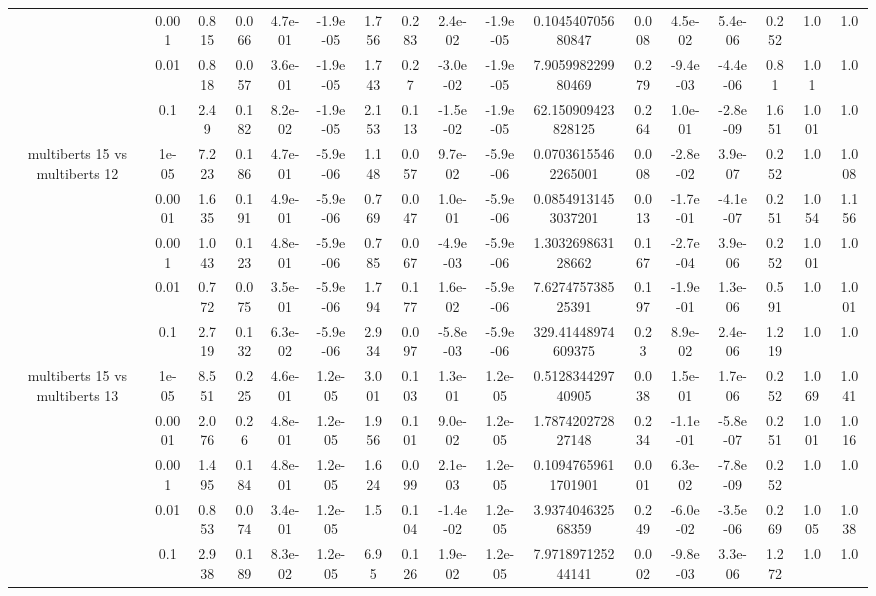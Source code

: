\begin{tabular}{|c|c|c|c|c|c|c|c|c|c|c|c|c|c|c|c|c|}
 & 0.001 & 0.815 & 0.066 & 4.7e-01 & -1.9e-05 & 1.756 & 0.283 & 2.4e-02 & -1.9e-05 & 0.104540705680847 & 0.008 & 4.5e-02 & 5.4e-06 & 0.252 & 1.0 & 1.0 \\
 & 0.01 & 0.818 & 0.057 & 3.6e-01 & -1.9e-05 & 1.743 & 0.27 & -3.0e-02 & -1.9e-05 & 7.905998229980469 & 0.279 & -9.4e-03 & -4.4e-06 & 0.81 & 1.01 & 1.0 \\
 & 0.1 & 2.49 & 0.182 & 8.2e-02 & -1.9e-05 & 2.153 & 0.113 & -1.5e-02 & -1.9e-05 & 62.150909423828125 & 0.264 & 1.0e-01 & -2.8e-09 & 1.651 & 1.001 & 1.0 \\
\hline
\multirow{5}{*}{multiberts 15 vs multiberts 12} & 1e-05 & 7.223 & 0.186 & 4.7e-01 & -5.9e-06 & 1.148 & 0.057 & 9.7e-02 & -5.9e-06 & 0.07036155462265001 & 0.008 & -2.8e-02 & 3.9e-07 & 0.252 & 1.0 & 1.008 \\
 & 0.0001 & 1.635 & 0.191 & 4.9e-01 & -5.9e-06 & 0.769 & 0.047 & 1.0e-01 & -5.9e-06 & 0.08549131453037201 & 0.013 & -1.7e-01 & -4.1e-07 & 0.251 & 1.054 & 1.156 \\
 & 0.001 & 1.043 & 0.123 & 4.8e-01 & -5.9e-06 & 0.785 & 0.067 & -4.9e-03 & -5.9e-06 & 1.303269863128662 & 0.167 & -2.7e-04 & 3.9e-06 & 0.252 & 1.001 & 1.0 \\
 & 0.01 & 0.772 & 0.075 & 3.5e-01 & -5.9e-06 & 1.794 & 0.177 & 1.6e-02 & -5.9e-06 & 7.627475738525391 & 0.197 & -1.9e-01 & 1.3e-06 & 0.591 & 1.0 & 1.001 \\
 & 0.1 & 2.719 & 0.132 & 6.3e-02 & -5.9e-06 & 2.934 & 0.097 & -5.8e-03 & -5.9e-06 & 329.41448974609375 & 0.23 & 8.9e-02 & 2.4e-06 & 1.219 & 1.0 & 1.0 \\
\hline
\multirow{5}{*}{multiberts 15 vs multiberts 13} & 1e-05 & 8.551 & 0.225 & 4.6e-01 & 1.2e-05 & 3.001 & 0.103 & 1.3e-01 & 1.2e-05 & 0.512834429740905 & 0.038 & 1.5e-01 & 1.7e-06 & 0.252 & 1.069 & 1.041 \\
 & 0.0001 & 2.076 & 0.26 & 4.8e-01 & 1.2e-05 & 1.956 & 0.101 & 9.0e-02 & 1.2e-05 & 1.787420272827148 & 0.234 & -1.1e-01 & -5.8e-07 & 0.251 & 1.001 & 1.016 \\
 & 0.001 & 1.495 & 0.184 & 4.8e-01 & 1.2e-05 & 1.624 & 0.099 & 2.1e-03 & 1.2e-05 & 0.10947659611701901 & 0.001 & 6.3e-02 & -7.8e-09 & 0.252 & 1.0 & 1.0 \\
 & 0.01 & 0.853 & 0.074 & 3.4e-01 & 1.2e-05 & 1.5 & 0.104 & -1.4e-02 & 1.2e-05 & 3.937404632568359 & 0.249 & -6.0e-02 & -3.5e-06 & 0.269 & 1.005 & 1.038 \\
 & 0.1 & 2.938 & 0.189 & 8.3e-02 & 1.2e-05 & 6.95 & 0.126 & 1.9e-02 & 1.2e-05 & 7.971897125244141 & 0.002 & -9.8e-03 & 3.3e-06 & 1.272 & 1.0 & 1.0 \\

\end{tabular}
